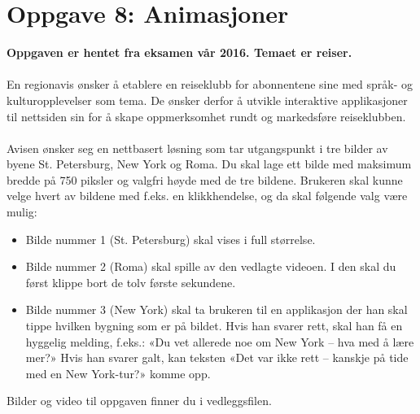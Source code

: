 \documentclass[a4paper, norsk, 10pt]{article}
\begin{document}
\section*{Oppgave 8: Animasjoner}
\textbf{Oppgaven er hentet fra eksamen vår 2016. Temaet er reiser.} 	\\
\ \\
En regionavis ønsker å etablere en reiseklubb for abonnentene sine med språk- og kulturopplevelser som tema. De ønsker derfor å utvikle interaktive applikasjoner til nettsiden sin for å skape oppmerksomhet rundt og markedsføre reiseklubben.\\
\ \\
Avisen ønsker seg en nettbasert løsning som tar utgangspunkt i tre bilder av byene St. Petersburg, New York og Roma. Du skal lage ett bilde med maksimum bredde på 750 piksler og valgfri høyde med de tre bildene. Brukeren skal kunne velge hvert av bildene med f.eks. en klikkhendelse, og da skal følgende valg være mulig:\\
\begin{itemize} 
\item Bilde nummer 1 (St. Petersburg) skal vises i full størrelse.
\item Bilde nummer 2 (Roma) skal spille av den vedlagte videoen. I den skal du først klippe bort de tolv første sekundene.
\item Bilde nummer 3 (New York) skal ta brukeren til en applikasjon der han skal tippe hvilken bygning som er på bildet. Hvis han svarer rett, skal han få en hyggelig melding, f.eks.: «Du vet allerede noe om New York – hva med å lære mer?» Hvis han svarer galt, kan teksten «Det var ikke rett – kanskje på tide med en New York-tur?» komme opp.
\end{itemize}
Bilder og video til oppgaven finner du i vedleggsfilen.
\end{document}
